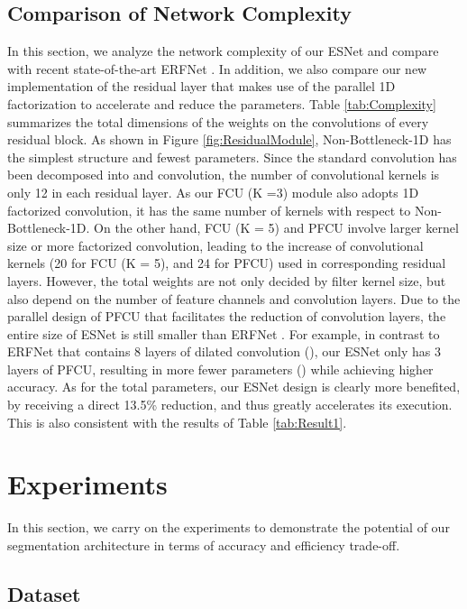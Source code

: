\documentclass[runningheads]{llncs}
\begin{document}
\subsection{Comparison of Network Complexity}

In this section, we analyze the network complexity of our ESNet and compare with recent state-of-the-art ERFNet \cite{Romera2018erfnet}. In addition, we also compare our new implementation of the residual layer that makes use of the parallel 1D factorization to accelerate and reduce the parameters. Table \ref{tab:Complexity} summarizes the total dimensions of the weights on the convolutions of every residual block. As shown in Figure \ref{fig:ResidualModule}, Non-Bottleneck-1D has the simplest structure and fewest parameters. Since the standard  convolution has been decomposed into  and  convolution, the number of convolutional kernels is only 12 in each residual layer. As our FCU (K =3) module also adopts 1D factorized convolution, it has the same number of kernels with respect to Non-Bottleneck-1D. On the other hand, FCU (K = 5) and PFCU involve larger kernel size or more factorized convolution, leading to the increase of convolutional kernels (20 for FCU (K = 5), and 24 for PFCU) used in corresponding residual layers. However, the total weights are not only decided by filter kernel size, but also depend on the number of feature channels and convolution layers. Due to the parallel design of PFCU that facilitates the reduction of convolution layers, the entire size of ESNet is still smaller than ERFNet \cite{Romera2018erfnet}. For example, in contrast to ERFNet \cite{Romera2018erfnet} that contains 8 layers of dilated convolution (), our ESNet only has 3 layers of PFCU, resulting in more fewer parameters () while achieving higher accuracy. As for the total parameters, our ESNet design is clearly more benefited, by receiving a direct 13.5\% reduction, and thus greatly accelerates its execution. This is also consistent with the results of Table \ref{tab:Result1}.

\section{Experiments}\label{sec:Experiments}

In this section, we carry on the experiments to demonstrate the potential of our segmentation architecture in terms of accuracy and efficiency trade-off.

\subsection{Dataset}
\end{document}
